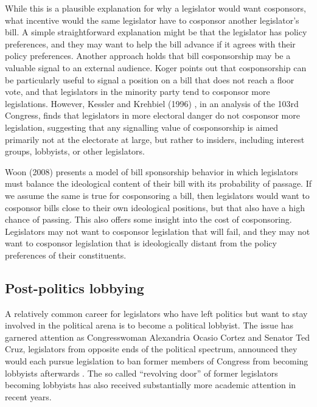 \documentclass{article}
\begin{document}
While this is a plausible explanation for why a legislator would want cosponsors, what incentive would the same legislator have to cosponsor another legislator's bill. A simple straightforward explanation might be that the legislator has policy preferences, and they may want to help the bill advance if it agrees with their policy preferences. Another approach holds that bill cosponsorship may be a valuable signal to an external audience. Koger \cite{koger2003} points out that cosponsorship can be particularly useful to signal a position on a bill that does not reach a floor vote, and that legislators in the minority party tend to cosponsor more legislations. However, Kessler and Krehbiel (1996) \cite{kessler_krehbiel1996}, in an analysis of the 103rd Congress, finds that legislators in more electoral danger do not cosponsor more legislation, suggesting that any signalling value of cosponsorship is aimed primarily not at the electorate at large, but rather to insiders, including interest groups, lobbyists, or other legislators. 

Woon (2008) \cite{woon2008} presents a model of bill sponsorship behavior in which legislators must balance the ideological content of their bill with its probability of passage. If we assume the same is true for cosponsoring a bill, then legislators would want to cosponsor bills close to their own ideological positions, but that also have a high chance of passing. This also offers some insight into the cost of cosponsoring. Legislators may not want to cosponsor legislation that will fail, and they may not want to cosponsor legislation that is ideologically distant from the policy preferences of their constituents. 

\subsection{Post-politics lobbying}
A relatively common career for legislators who have left politics but want to stay involved in the political arena is to become a political lobbyist. The issue has garnered attention as Congresswoman Alexandria Ocasio Cortez and Senator Ted Cruz, legislators from opposite ends of the political spectrum, announced they would each pursue legislation to ban former members of Congress from becoming lobbyists afterwards \cite{vox_lobbying}. The so called ``revolving door'' of former legislators becoming lobbyists has also received substantially more academic attention in recent years.
\end{document}
